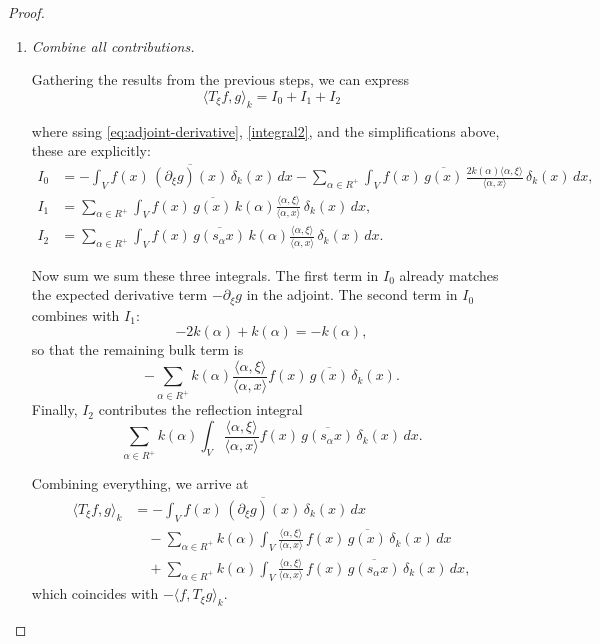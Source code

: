 \documentclass[12pt]{article}
\newcommand{\1}{\mathbbm{1}}
\theoremstyle{definition}
\begin{document}
\begin{proof}
\begin{enumerate}
Therefore, we can transform the integrand in \eqref{integral2} as
\[
  \frac{\langle \alpha,\xi\rangle}{\langle \alpha,s_\alpha y\rangle}
  = -\,\frac{\langle \alpha,\xi\rangle}{\langle \alpha,y\rangle}.
\]

and follows that
\[
  I_2 = \sum_{\alpha \in R^+} k(\alpha)\int_V
    \frac{\langle \alpha,\xi\rangle}{\langle \alpha,y\rangle}\,
      f(y)\,\overline{g(s_\alpha y)}\,\delta_k(y)\,dy.
\]

\item \textsl{Combine all contributions.}  

Gathering the results from the previous steps, we can express
\[
  \langle T_\xi f, g \rangle_k
  = I_0+I_1+I_2
\]


where ssing \eqref{eq:adjoint-derivative}, \eqref{integral2}, and the simplifications above, these are explicitly:
\begin{align*}
I_0
  &= -\int_V f(x)\,\overline{(\partial_\xi g)(x)}\,\delta_k(x)\,dx
     - \sum_{\alpha \in R^+}\int_V
        f(x)\,\overline{g(x)}\,
        \frac{2k(\alpha)\langle \alpha,\xi\rangle}{\langle \alpha,x\rangle}\,
        \delta_k(x)\,dx,\\[3mm]
I_1
  &= \sum_{\alpha \in R^+}\int_V
        f(x)\,\overline{g(x)}\,
        k(\alpha)\frac{\langle \alpha,\xi\rangle}{\langle \alpha,x\rangle}\,
        \delta_k(x)\,dx,\\[3mm]
I_2
  &= \sum_{\alpha \in R^+}\int_V
        f(x)\,\overline{g(s_\alpha x)}\,
        k(\alpha)\frac{\langle \alpha,\xi\rangle}{\langle \alpha,x\rangle}\,
        \delta_k(x)\,dx.
\end{align*}

Now sum we sum these three integrals.
The first term in $I_0$ already matches the expected derivative term
$-\partial_\xi g$ in the adjoint.  
The second term in $I_0$ combines with $I_1$:
\[
-2k(\alpha) + k(\alpha) = -k(\alpha),
\]
so that the remaining bulk term is
\[
 -\sum_{\alpha \in R^+} k(\alpha)
   \frac{\langle \alpha,\xi\rangle}{\langle \alpha,x\rangle}
   f(x)\,\overline{g(x)}\,\delta_k(x).
\]
Finally, $I_2$ contributes the reflection integral
\[
 \sum_{\alpha \in R^+} k(\alpha)\int_V
   \frac{\langle \alpha,\xi\rangle}{\langle \alpha,x\rangle}
   f(x)\,\overline{g(s_\alpha x)}\,\delta_k(x)\,dx.
\]

Combining everything, we arrive at
\begin{align*}
\langle T_\xi f, g \rangle_k
  &= -\int_V f(x)\,\overline{(\partial_\xi g)(x)}\,\delta_k(x)\,dx \\
  &\quad - \sum_{\alpha \in R^+} k(\alpha)\int_V
       \frac{\langle \alpha,\xi\rangle}{\langle \alpha,x\rangle}\,
       f(x)\,\overline{g(x)}\,\delta_k(x)\,dx \\
  &\quad + \sum_{\alpha \in R^+} k(\alpha)\int_V
       \frac{\langle \alpha,\xi\rangle}{\langle \alpha,x\rangle}\,
       f(x)\,\overline{g(s_\alpha x)}\,\delta_k(x)\,dx,
\end{align*}
which coincides with $-\langle f, T_\xi g\rangle_k$.


\end{enumerate}
\end{proof}
\end{document}
